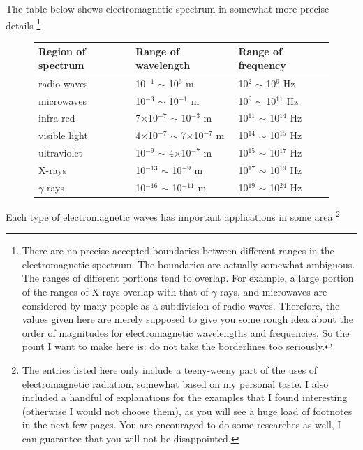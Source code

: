 \documentclass[a4paper,12pt]{book}
\newcounter{example}[chapter]
\begin{document}
The table below shows electromagnetic spectrum in somewhat more precise details \footnote[][-2cm]{There are no precise accepted boundaries between different ranges in the electromagnetic spectrum. The boundaries are actually somewhat ambiguous. The ranges of different portions tend to overlap. For example, a large portion of the ranges of X-rays overlap with that of $\gamma$-rays, and microwaves are considered by many people as a subdivision of radio waves. Therefore, the values given here are merely supposed to give you some rough idea about the order of magnitudes for electromagnetic wavelengths and frequencies. So the point I want to make here is: do not take the borderlines too seriously.}
\vspace{3cm}
\begin{figure}
\begin{center}
	\begin{tabular}{|C{4cm}|C{4cm}|C{4cm}|}
		\hline Region of spectrum & Range of wavelength & Range of frequency \\ 
		\hline radio waves  & 10$^{-1}$ $\sim$ 10$^{6}$ m & 10$^{2}$ $\sim$ 10$^{9}$ Hz \\ 
		\hline microwaves & 10$^{-3}$ $\sim$ 10$^{-1}$ m & 10$^{9}$ $\sim$ 10$^{11}$ Hz \\ 
		\hline infra-red & 7$\times$10$^{-7}$ $\sim$ 10$^{-3}$ m & 10$^{11}$ $\sim$ 10$^{14}$ Hz \\ 
		\hline visible light  & 4$\times$10$^{-7}$ $\sim$ 7$\times$10$^{-7}$ m & 10$^{14}$ $\sim$ 10$^{15}$ Hz \\ 
		\hline ultraviolet & 10$^{-9}$ $\sim$ 4$\times$10$^{-7}$ m & 10$^{15}$ $\sim$ 10$^{17}$ Hz \\ 
		\hline X-rays & 10$^{-13}$ $\sim$ 10$^{-9}$ m & 10$^{17}$ $\sim$ 10$^{19}$ Hz \\ 
		\hline $\gamma$-rays & 10$^{-16}$ $\sim$ 10$^{-11}$ m & 10$^{19}$ $\sim$ 10$^{24}$ Hz\\ 
		\hline
	\end{tabular} 
\end{center}
\end{figure}

Each type of electromagnetic waves has important applications in some area
\footnote{The entries listed here only include a teeny-weeny part of the uses of electromagnetic radiation, somewhat based on my personal taste. I also included a handful of explanations for the examples that I found interesting (otherwise I would not choose them), as you will see a huge load of footnotes in the next few pages. You are encouraged to do some researches as well, I can guarantee that you will not be disappointed.}
\end{document}
